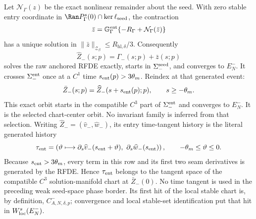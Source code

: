 \begin{lemma}
Let \(\mathcal N_\Gamma(z)\) be the exact nonlinear remainder about the
seed.  With zero stable entry coordinate in
\(\Ran P_\Gamma^s(0)\cap\ker\ell_{\rm seed}\), the contraction
\begin{equation}
 \bar z
 =\mathbb G_\Gamma^{\rm ent}
       \{-R_\Gamma+\mathcal N_\Gamma(\bar z)\}         \label{eq:anchor-chart-center-fixed-point}
\end{equation}
has a unique solution in
\(\|\bar z\|_{\mathscr Z_\beta}\le R_{\mathrm{hl},\delta}/3\).
Consequently
\begin{equation}
 \widehat Z_-(s;p)=\Gamma_-(s;p)+\bar z(s;p)
                                                               \label{eq:anchor-exact-seed-orbit}
\end{equation}
solves the raw anchored RFDE exactly, starts in
\(\Sigma_-^{\rm seed}\), and converges to \(E_N^-\).
It crosses \(\Sigma_-^{\rm ent}\) once at a \(C^1\) time
\(s_{\rm ent}(p)>3\theta_m\).  Reindex at that generated event:
\begin{equation}
 \bar Z_-(s;p)=\widehat Z_-(s+s_{\rm ent}(p);p),
 \qquad s\ge-\theta_m .                              \label{eq:anchor-exact-chart-center-orbit}
\end{equation}
This exact orbit starts in the compatible \(C^3\) part of
\(\Sigma_-^{\rm ent}\) and converges to \(E_N^-\).  It is the selected
chart-center orbit.  No invariant family is inferred from that selection.
Writing \(\widehat Z_-=(\widehat v_-,\widehat w_-)\), its entry time-tangent
history is the literal generated history
\begin{equation}
 \tau_{\rm ent}
 =\left(\vartheta\longmapsto
       \partial_s\widehat v_-(s_{\rm ent}+\vartheta),\
       \partial_s\widehat w_-(s_{\rm ent})\right),
 \qquad-\theta_m\le\vartheta\le0.                    \label{eq:anchor-compatible-entry-tangent}
\end{equation}
Because \(s_{\rm ent}>3\theta_m\), every term in this row and its first two
seam derivatives is generated by the RFDE.  Hence
\(\tau_{\rm ent}\) belongs to the tangent space of the compatible
\(C^3\) solution-manifold chart at \(\bar Z_-(0)\).  No time tangent is
used in the preceding weak seed-space phase border.
Its first hit of the local stable chart is, by definition,
\(C^-_{A,N,\delta,p}\); convergence and local stable-set identification
put that hit in \(W^s_{\rm loc}(E_N^-)\).


\end{lemma}
